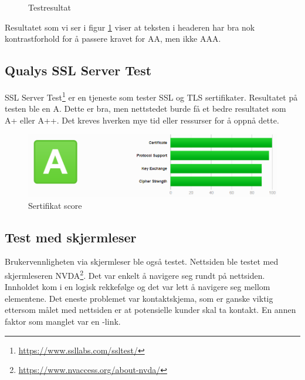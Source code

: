 \begin{figure}[H]
    \begin{center}

        \caption{Testresultat}
        \label{fig:analysis-current-a11y_bg-h1_p}
    \end{center}
\end{figure}

Resultatet som vi ser i figur \ref{fig:analysis-current-a11y_bg-h1_p} viser at teksten i headeren har bra nok kontrastforhold for å passere kravet for AA, men ikke AAA. 

\subsection{Qualys SSL Server Test}
SSL Server Test\footnote{\url{https://www.ssllabs.com/ssltest/}} er en tjeneste som tester SSL og TLS sertifikater. Resultatet på testen ble en A. Dette er bra, men nettstedet burde få et bedre resultatet som A+ eller A++. Det kreves hverken mye tid eller ressurser for å oppnå dette.

\begin{figure}[H]
    \centering
    \includegraphics[width=\textwidth]{bjornar/ssllabs.png}
    \caption{Sertifikat score}
    \label{fig:analysis-current-ssl}
\end{figure}

\subsection{Test med skjermleser}
Brukervennligheten via skjermleser ble også testet. Nettsiden ble testet med skjermleseren NVDA\footnote{\url{https://www.nvaccess.org/about-nvda/}}. Det var enkelt å navigere seg rundt på nettsiden. Innholdet kom i en logisk rekkefølge og det var lett å navigere seg mellom elementene. Det eneste problemet var kontaktskjema, som er ganske viktig ettersom målet med nettsiden er at potensielle kunder skal ta kontakt. En annen faktor som manglet var en -link.

